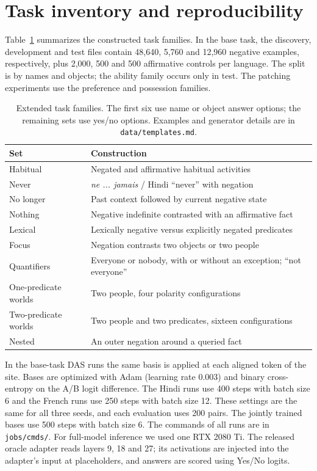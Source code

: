 \documentclass[11pt]{article}
\begin{document}


\clearpage
\appendix
\section{Task inventory and reproducibility}
\label{app:data}
Table~\ref{tab:taskinventory} summarizes the constructed task families. In the base task, the discovery, development and test files contain 48,640, 5,760 and 12,960 negative examples, respectively, plus 2,000, 500 and 500 affirmative controls per language. The split is by names and objects; the ability family occurs only in test. The patching experiments use the preference and possession families.

\begin{table}[t]
\small
\begin{tabularx}{\linewidth}{@{}lX@{}}
\toprule
Set & Construction \\
\midrule
Habitual & Negated and affirmative habitual activities \\
Never & \emph{ne ... jamais} / Hindi ``never'' with negation \\
No longer & Past context followed by current negative state \\
Nothing & Negative indefinite contrasted with an affirmative fact \\
Lexical & Lexically negative versus explicitly negated predicates \\
Focus & Negation contrasts two objects or two people \\
Quantifiers & Everyone or nobody, with or without an exception; ``not everyone'' \\
One-predicate worlds & Two people, four polarity configurations \\
Two-predicate worlds & Two people and two predicates, sixteen configurations \\
Nested & An outer negation around a queried fact \\
\bottomrule
\end{tabularx}
\caption{Extended task families. The first six use name or object answer options; the remaining sets use yes/no options. Examples and generator details are in \texttt{data/templates.md}.}
\label{tab:taskinventory}
\end{table}

In the base-task DAS runs the same basis is applied at each aligned token of the site. Bases are optimized with Adam (learning rate 0.003) and binary cross-entropy on the A/B logit difference. The Hindi runs use 400 steps with batch size 6 and the French runs use 250 steps with batch size 12. These settings are the same for all three seeds, and each evaluation uses 200 pairs. The jointly trained bases use 500 steps with batch size 6. The commands of all runs are in \texttt{jobs/cmds/}. For full-model inference we used one RTX 2080 Ti. The released oracle adapter reads layers 9, 18 and 27; its activations are injected into the adapter's input at placeholders, and answers are scored using Yes/No logits.
\end{document}
